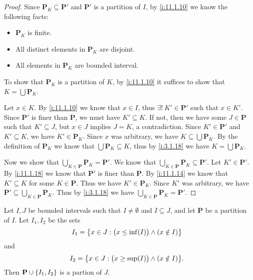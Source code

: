 \begin{proof}
  Since \(\mathbf{P}_K \subseteq \mathbf{P}'\) and \(\mathbf{P}'\) is a partition of \(I\), by \cref{i:11.1.10} we know the following facts:
  \begin{itemize}
    \item \(\mathbf{P}_K\) is finite.
    \item All distinct elements in \(\mathbf{P}_K\) are disjoint.
    \item All elements in \(\mathbf{P}_K\) are bounded interval.
  \end{itemize}
  To show that \(\mathbf{P}_K\) is a partition of \(K\), by \cref{i:11.1.10} it suffices to show that \(K = \bigcup \mathbf{P}_K\).

  Let \(x \in K\).
  By \cref{i:11.1.10} we know that \(x \in I\), thus \(\exists!\ K' \in \mathbf{P}'\) such that \(x \in K'\).
  Since \(\mathbf{P}'\) is finer than \(\mathbf{P}\), we must have \(K' \subseteq K\).
  If not, then we have some \(J \in \mathbf{P}\) such that \(K' \subseteq J\), but \(x \in J\) implies \(J = K\), a contradiction.
  Since \(K' \in \mathbf{P}'\) and \(K' \subseteq K\), we have \(K' \in \mathbf{P}_K\).
  Since \(x\) was arbitrary, we have \(K \subseteq \bigcup \mathbf{P}_K\).
  By the definition of \(\mathbf{P}_K\) we know that \(\bigcup \mathbf{P}_K \subseteq K\), thus by \cref{i:3.1.18} we have \(K = \bigcup \mathbf{P}_K\).

  Now we show that \(\bigcup_{K \in \mathbf{P}} \mathbf{P}_K = \mathbf{P}'\).
  We know that \(\bigcup_{K \in \mathbf{P}} \mathbf{P}_K \subseteq \mathbf{P}'\).
  Let \(K' \in \mathbf{P}'\).
  By \cref{i:11.1.18} we know that \(\mathbf{P}'\) is finer than \(\mathbf{P}\).
  By \cref{i:11.1.14} we know that \(K' \subseteq K\) for some \(K \in \mathbf{P}\).
  Thus we have \(K' \in \mathbf{P}_K\).
  Since \(K'\) was arbitrary, we have \(\mathbf{P}' \subseteq \bigcup_{K \in \mathbf{P}} \mathbf{P}_K\).
  Thus by \cref{i:3.1.18} we have \(\bigcup_{K \in \mathbf{P}} \mathbf{P}_K = \mathbf{P}'\).
\end{proof}

\begin{ac}\label{i:ac:11.1.5}
  Let \(I, J\) be bounded intervals such that \(I \neq \emptyset\) and \(I \subseteq J\), and let \(\mathbf{P}\) be a partition of \(I\).
  Let \(I_1, I_2\) be the sets
  \[
    I_1 = \left\lbrace x \in J : \big(x \leq \inf(I)\big) \land (x \notin I)\right\rbrace
  \]
  and
  \[
    I_2 = \set{x \in J : \big(x \geq \sup(I)\big) \land (x \notin I)}.
  \]
  Then \(\mathbf{P} \cup \left\lbrace I_1, I_2\right\rbrace\) is a partion of \(J\).
\end{ac}

